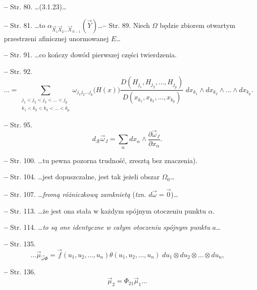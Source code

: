 \documentclass[a4paper]{article}
\newcommand{\tb}{\textbf}
\newcommand{\noi}{\noindent}
\newcommand{\start}{\noi \tb{--} {}}
\begin{document}
\start Str. 80. \ldots (3.1.23)\ldots

\start Str. 81. \ldots to
$\alpha_{ \vec{ X }_{ 1 } \vec{ X }_{ 2 } \ldots \vec{ X }_{ N - 1 } }
( \vec{ Y } )$\ldots \start Str. 89. Niech $\Omega$ będzie zbiorem
otwartym przestrzeni af\mbox{}inicznej unormowanej $E$\ldots

\start Str. 91. \ldots co kończy dowód pierwszej części twierdzenia.

\start Str. 92. $$\ldots = \sum_{ \substack{ j_{ 1 } < j_{ 2 } < j_{ 3 } < \ldots < j_{ p } \\
    k_{ 1 } < k_{ 2 } < k_{ 3 } < \ldots < k_{ p } } } \omega_{ j_{ 1
  } j_{ 2 } \ldots j_{ p } } \big( H( x ) \big) \frac{ D( H_{ j_{ 1 }
  }, H_{ j_{ 2 } }, \ldots, H_{ j_{ p } } ) }{ D( x_{ k_{ 1 } }, x_{
    k_{ 2 } }, \ldots, x_{ k_{ p } } ) } \; dx_{ k_{ 1 } } \wedge dx_{
  k_{ 2 } } \wedge \ldots \wedge dx_{ k_{ p } } \textrm{.}$$

\start Str. 95. $$d_{ \mathcal{ R } } \vec{ \omega }_{ J } = \sum_{ \alpha } dx_{
  \alpha} \wedge \frac{ \partial \vec{ \omega }_{ J } }{ \partial
  x_{ \alpha } } \textrm{.}$$

\start Str. 100. \ldots tu pewna pozorna trudność, zresztą bez
znaczenia).

\start Str. 104. \ldots jest dopuszczalne, jest tak jeżeli obszar
$\Omega_{ 0 }$\ldots

\start Str. 107. \ldots\emph{fromą różniczkową zamknietą}
(\emph{tzn. $d\vec{ \omega } = \vec{ 0 }$})\ldots

\start Str. 113. \ldots że jest ona stała w każdym spójnym otoczeniu
punktu $\alpha$.

\start Str. 114. \ldots\emph{to są one identyczne w całym otoczeniu
  spójnym punktu} $a$\ldots

\start Str. 135.
$$\ldots \vec{ \mu }_{ \vec{ \omega } \Phi } = \vec{ f }( u_{ 1 },
u_{ 2 }, \ldots, u_{ n } ) \theta( u_{ 1 }, u_{ 2 }, \ldots, u_{ n }
) \; du_{ 1 } \otimes du_{ 2 } \otimes \ldots \otimes du_{ n }
\textrm{,}$$

\start Str. 136.
$$\vec{ \mu }_{ 2 } = \Phi_{ 2 1 } \vec{ \mu }_{ 1 } \ldots$$




   {}
\end{document}
